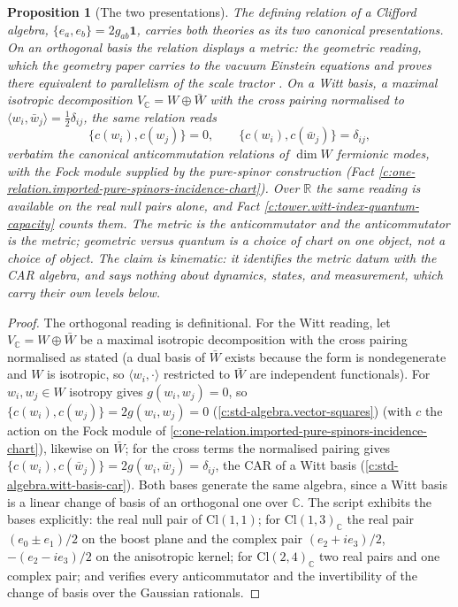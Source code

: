 \documentclass[11pt]{article}
\newtheorem{proposition}[theorem]{Proposition}
\theoremstyle{definition}
\theoremstyle{plain}
\newcommand{\changedmark}[2]{\marginpar{\raggedright\scriptsize\color{#1}#2}}
\providecommand{\C}{}\renewcommand{\C}{\mathbb{C}}
\providecommand{\Cl}{}\renewcommand{\Cl}{\mathrm{Cl}}
\providecommand{\R}{}\renewcommand{\R}{\mathbb{R}}
\providecommand{\ip}{}\renewcommand{\ip}[2]{\langle #1, #2\rangle}
\begin{document}
\begin{proposition}[The two presentations]\label{c:one-relation.two-presentations}
\changedmark{gray}{reworded}
The defining relation of a Clifford algebra, $\{e_{a}, e_{b}\} = 2g_{ab}\mathbf{1}$, carries both theories as its two canonical presentations. On an orthogonal basis the relation displays a metric: the geometric reading, which the geometry paper carries to the vacuum Einstein equations and proves there equivalent to parallelism of the scale tractor \cite[Thm.~4.5]{ButlerT6}. On a Witt basis, a maximal isotropic decomposition $V_{\C} = W \oplus \bar{W}$ with the cross pairing normalised to $\ip{w_{i}}{\bar{w}_{j}} = \tfrac12\delta_{ij}$, the same relation reads
\[
\{c(w_{i}), c(w_{j})\} = 0, \qquad \{c(w_{i}), c(\bar{w}_{j})\} = \delta_{ij},
\]
verbatim the canonical anticommutation relations of $\dim W$ fermionic modes, with the Fock module supplied by the pure-spinor construction (Fact \ref{c:one-relation.imported-pure-spinors-incidence-chart}). Over $\R$ the same reading is available on the real null pairs alone, and Fact \ref{c:tower.witt-index-quantum-capacity} counts them. The metric is the anticommutator and the anticommutator is the metric; geometric versus quantum is a choice of chart on one object, not a choice of object. The claim is kinematic: it identifies the metric datum with the CAR algebra, and says nothing about dynamics, states, and measurement, which carry their own levels below.
\end{proposition}
\begin{proof}
The orthogonal reading is definitional. For the Witt reading, let $V_{\C} = W \oplus \bar{W}$ be a maximal isotropic decomposition with the cross pairing normalised as stated (a dual basis of $\bar{W}$ exists because the form is nondegenerate and $W$ is isotropic, so $\ip{w_{i}}{\cdot}$ restricted to $\bar{W}$ are independent functionals). For $w_{i}, w_{j} \in W$ isotropy gives $g(w_{i}, w_{j}) = 0$, so $\{c(w_{i}), c(w_{j})\} = 2g(w_{i}, w_{j}) = 0$ (\ref{c:std-algebra.vector-squares}) (with $c$ the action on the Fock module of \ref{c:one-relation.imported-pure-spinors-incidence-chart}), likewise on $\bar{W}$; for the cross terms the normalised pairing gives $\{c(w_{i}), c(\bar{w}_{j})\} = 2g(w_{i}, \bar{w}_{j}) = \delta_{ij}$, the CAR of a Witt basis (\ref{c:std-algebra.witt-basis-car}). Both bases generate the same algebra, since a Witt basis is a linear change of basis of an orthogonal one over $\C$. The script exhibits the bases explicitly: the real null pair of $\Cl(1,1)$; for $\Cl(1,3)_{\C}$ the real pair $(e_{0} \pm e_{1})/2$ on the boost plane and the complex pair $(e_{2} + ie_{3})/2$, $-(e_{2} - ie_{3})/2$ on the anisotropic kernel; for $\Cl(2,4)_{\C}$ two real pairs and one complex pair; and verifies every anticommutator and the invertibility of the change of basis over the Gaussian rationals.

\end{proof}
\end{document}
